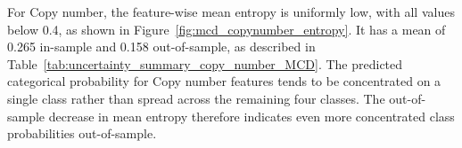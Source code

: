 \begin{table}
\centering
{}
\caption{Summary table of uncertainty metrics obtained from Monte Carlo Dropout for Copy number, split by in-sample and out-of-sample subsets.}
\label{tab:uncertainty_summary_copy_number_MCD}
\end{table}



For Copy number, the feature-wise mean entropy is uniformly low, with all values below 0.4, as shown in Figure~\ref{fig:mcd_copynumber_entropy}. It has a mean of 0.265 in-sample and 0.158 out-of-sample, as described in Table~\ref{tab:uncertainty_summary_copy_number_MCD}. The predicted categorical probability for Copy number features tends to be concentrated on a single class rather than spread across the remaining four classes. The out-of-sample decrease in mean entropy therefore indicates even more concentrated class probabilities out-of-sample.

